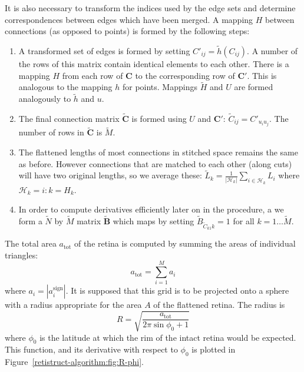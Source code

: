 \documentclass{article}
\begin{document}
It is also necessary to transform the indices used by the edge sets
and determine correspondences between edges which have been merged. A
mapping $H$ between connections (as opposed to points) is formed by
the following steps:
\begin{enumerate}
\item A transformed set of edges is formed by setting $C'_{ij} =
  \tilde h(C_{ij})$. A number of the rows of this matrix contain
  identical elements to each other. There is a mapping $H$ from each
  row of $\mathbf{C}$ to the corresponding row of $\mathbf{C'}$. This
  is analogous to the mapping $h$ for points. Mappings $\tilde{H}$ and
  $U$ are formed analogously to $\tilde{h}$ and $u$.
\item The final connection matrix $\tilde{\mathbf{C}}$ is formed using
  $U$ and $\mathbf{C}'$: $\tilde C_{ij} = C'_{u_iu_j}$. The number
  of rows in $\tilde{\mathbf{C}}$ is $\tilde M$.
\item The flattened lengths of most connections in stitched space
  remains the same as before. However connections that are matched to
  each other (along cuts) will have two original lengths, so we
  average these: $\tilde L_k = \frac{1}{|\mathcal{H}_k|}
  \sum_{i\in\mathcal{H}_k} L_i$ where $\mathcal{H}_k = i: k=H_k$.
\item In order to compute derivatives efficiently later on in the
  procedure, a we form a $\tilde N$ by $\tilde M$ matrix
  $\tilde{\mathbf{B}}$ which maps by setting $\tilde B_{\tilde
    C_{k1}k} = 1$ %
  for all
  $k=1\dots \tilde M$.
\end{enumerate}

The total area $a_\mathrm{tot}$ of the retina is computed by summing the areas of
individual triangles:
\begin{displaymath}
  a_\mathrm{tot} = \sum_{i=1}^M a_i
\end{displaymath}
where $a_i = | a_i^\mathrm{sign}|$.  It is supposed that this grid is
to be projected onto a sphere with a radius appropriate for the area
$A$ of the flattened retina. The radius is
\begin{equation}
  \label{fold-sphere:eq:1}
  R = \sqrt{\frac{a_\mathrm{tot}}{2\pi\sin\phi_0+1}}
\end{equation}
where $\phi_0$ is the latitude at which the rim of the intact retina
would be expected. This function, and its derivative with respect to
$\phi_0$ is plotted in Figure~\ref{retistruct-algorithm:fig:R-phi}.
\end{document}
